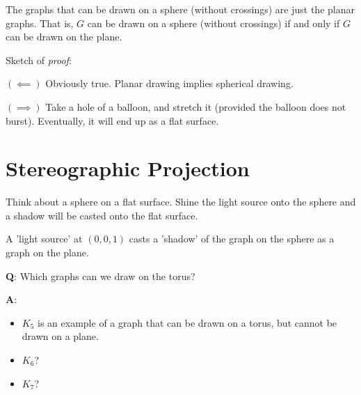 \begin{thmbox}
    \begin{prop}
        The graphs that can be drawn on a sphere (without crossings)
        are just the planar graphs. That is, $ G $ can be drawn
        on a sphere (without crossings)
        if and only if $ G $ can be drawn on the plane.
    \end{prop}
\end{thmbox}

Sketch of \emph{proof}:

$ (\impliedby) $ Obviously true. Planar drawing implies spherical drawing.

$ (\implies) $ Take a hole of a balloon, and stretch it (provided the balloon
does not burst). Eventually, it will end up as a flat surface.

\section{Stereographic Projection}
Think about a sphere on a flat surface. Shine the light source onto the sphere
and a shadow will be casted onto the flat surface.

A 'light source' at $ (0,0,1) $ casts a 'shadow' of the graph on the sphere as
a graph on the plane.

\textbf{Q}: Which graphs can we draw on the torus?

\textbf{A}:
\begin{itemize}
    \item $ K_5 $ is an example of a graph that can be drawn on
          a torus, but cannot be drawn on a plane.
    \item $ K_6 $?
    \item $ K_7 $?
\end{itemize}
